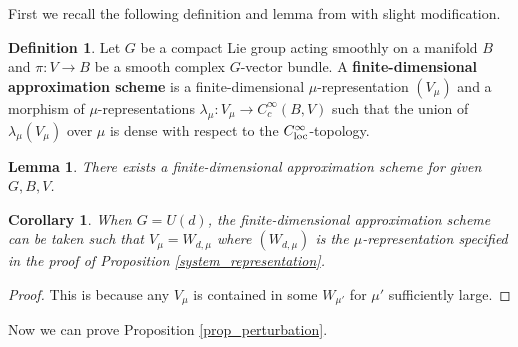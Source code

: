 \documentclass[reqno, 10pt]{amsart}
\numberwithin{equation}{section}
\numberwithin{equation}{section}
\newtheorem{cor}[thm]{Corollary}
\newtheorem{lemma}[thm]{Lemma}
\theoremstyle{definition}
\newtheorem{defn}[thm]{Definition}
\theoremstyle{remark}
\begin{document}
First we recall the following definition and lemma from \cite{AMS2} with slight modification.

\begin{defn}
Let $G$ be a compact Lie group acting smoothly on a manifold $B$ and $\pi: V \to B$ be a smooth complex $G$-vector bundle. A {\bf finite-dimensional approximation scheme} is a finite-dimensional $\mu$-representation $(V_\mu)$ and a morphism of $\mu$-representations $\lambda_\mu: V_\mu \to C_c^\infty(B, V)$  such that the union of $\lambda_\mu(V_\mu)$ over $\mu$ is dense with respect to the $C^\infty_{\rm loc}$-topology.
\end{defn}

\begin{lemma}\cite[Lemma 4.2]{AMS2}
There exists a finite-dimensional approximation scheme for given $G, B, V$. 
\end{lemma}

\begin{cor}
When $G = U(d)$, the finite-dimensional approximation scheme can be taken such that $V_\mu = W_{d, \mu}$ where $(W_{d, \mu})$ is the $\mu$-representation specified in the proof of Proposition \ref{system_representation}.
\end{cor}

\begin{proof}
This is because any $V_\mu$ is contained in some $W_{\mu'}$ for $\mu'$ sufficiently large.
\end{proof}

Now we can prove Proposition \ref{prop_perturbation}. 
\end{document}
